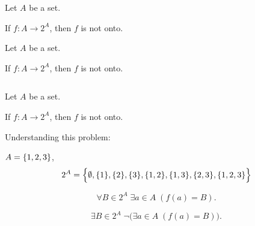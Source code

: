 \begin{frame}{}
  \begin{theorem}
    Let $A$ be a set. 

    If $f: A \to 2^{A}$, then $f$ is not onto.
  \end{theorem}

\end{frame}

\begin{frame}{}
  \begin{theorem}
    Let $A$ be a set. 

    If $f: A \to 2^{A}$, then $f$ is not onto.
  \end{theorem}

  \vspace{0.60cm}
  \begin{columns}
    \pause
    \pause
    \pause
    \pause
  \end{columns}
\end{frame}

\begin{frame}{}
  \begin{theorem}
    Let $A$ be a set. 

    If $f: A \to 2^{A}$, then $f$ is not onto.
  \end{theorem}

  \begin{exampleblock}{Understanding this problem:}
    \begin{description}
      \pause
      \item[$2^{A}$] $A = \{1,2,3\}$,
	\[
	  2^{A} = \Big\{\emptyset, \{1\}, \{2\}, \{3\}, \{1,2\}, \{1,3\}, \{2,3\}, \{1,2,3\}\Big\}
	\]
      \pause
      \item[Onto]
	\[
	  \forall B \in 2^{A}\; \exists a \in A\; (f(a) = B).
	\]
      \pause
      \item[Not Onto]
	\[
	  \exists B \in 2^{A}\; \lnot \Big(\exists a \in A\; (f(a) = B)\Big).
	\]
    \end{description}
  \end{exampleblock}
\end{frame}

